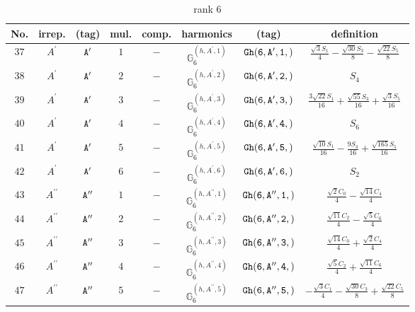 \documentclass[fleqn,8pt]{jsarticle}
\begin{document}
\begin{table}[ht!]
\begin{center}
\caption{rank 6}
\renewcommand{\arraystretch}{1.3}
\begin{tabular}{cccccccc} \hline \hline
No. & irrep. & (tag) & mul. & comp. & harmonics & (tag) & definition \\ \hline
$ 37 $ & $ A^{\prime} $ & $ {\tt A'} $ & $ 1 $ & $ - $ & $ \mathbb{G}_{6}^{(h,A^{\prime},1)} $ & $ {\tt Gh(6,A',1,)} $ & $ \frac{\sqrt{3} S_{1}}{4} - \frac{\sqrt{30} S_{3}}{8} - \frac{\sqrt{22} S_{5}}{8} $ \\
$ 38 $ & $ A^{\prime} $ & $ {\tt A'} $ & $ 2 $ & $ - $ & $ \mathbb{G}_{6}^{(h,A^{\prime},2)} $ & $ {\tt Gh(6,A',2,)} $ & $ S_{4} $ \\
$ 39 $ & $ A^{\prime} $ & $ {\tt A'} $ & $ 3 $ & $ - $ & $ \mathbb{G}_{6}^{(h,A^{\prime},3)} $ & $ {\tt Gh(6,A',3,)} $ & $ \frac{3 \sqrt{22} S_{1}}{16} + \frac{\sqrt{55} S_{3}}{16} + \frac{\sqrt{3} S_{5}}{16} $ \\
$ 40 $ & $ A^{\prime} $ & $ {\tt A'} $ & $ 4 $ & $ - $ & $ \mathbb{G}_{6}^{(h,A^{\prime},4)} $ & $ {\tt Gh(6,A',4,)} $ & $ S_{6} $ \\
$ 41 $ & $ A^{\prime} $ & $ {\tt A'} $ & $ 5 $ & $ - $ & $ \mathbb{G}_{6}^{(h,A^{\prime},5)} $ & $ {\tt Gh(6,A',5,)} $ & $ \frac{\sqrt{10} S_{1}}{16} - \frac{9 S_{3}}{16} + \frac{\sqrt{165} S_{5}}{16} $ \\
$ 42 $ & $ A^{\prime} $ & $ {\tt A'} $ & $ 6 $ & $ - $ & $ \mathbb{G}_{6}^{(h,A^{\prime},6)} $ & $ {\tt Gh(6,A',6,)} $ & $ S_{2} $ \\
$ 43 $ & $ A^{\prime\prime} $ & $ {\tt A''} $ & $ 1 $ & $ - $ & $ \mathbb{G}_{6}^{(h,A^{\prime\prime},1)} $ & $ {\tt Gh(6,A'',1,)} $ & $ \frac{\sqrt{2} C_{0}}{4} - \frac{\sqrt{14} C_{4}}{4} $ \\
$ 44 $ & $ A^{\prime\prime} $ & $ {\tt A''} $ & $ 2 $ & $ - $ & $ \mathbb{G}_{6}^{(h,A^{\prime\prime},2)} $ & $ {\tt Gh(6,A'',2,)} $ & $ \frac{\sqrt{11} C_{2}}{4} - \frac{\sqrt{5} C_{6}}{4} $ \\
$ 45 $ & $ A^{\prime\prime} $ & $ {\tt A''} $ & $ 3 $ & $ - $ & $ \mathbb{G}_{6}^{(h,A^{\prime\prime},3)} $ & $ {\tt Gh(6,A'',3,)} $ & $ \frac{\sqrt{14} C_{0}}{4} + \frac{\sqrt{2} C_{4}}{4} $ \\
$ 46 $ & $ A^{\prime\prime} $ & $ {\tt A''} $ & $ 4 $ & $ - $ & $ \mathbb{G}_{6}^{(h,A^{\prime\prime},4)} $ & $ {\tt Gh(6,A'',4,)} $ & $ \frac{\sqrt{5} C_{2}}{4} + \frac{\sqrt{11} C_{6}}{4} $ \\
$ 47 $ & $ A^{\prime\prime} $ & $ {\tt A''} $ & $ 5 $ & $ - $ & $ \mathbb{G}_{6}^{(h,A^{\prime\prime},5)} $ & $ {\tt Gh(6,A'',5,)} $ & $ - \frac{\sqrt{3} C_{1}}{4} - \frac{\sqrt{30} C_{3}}{8} + \frac{\sqrt{22} C_{5}}{8} $ \\

\end{tabular}
\end{center}
\end{table}
\end{document}

